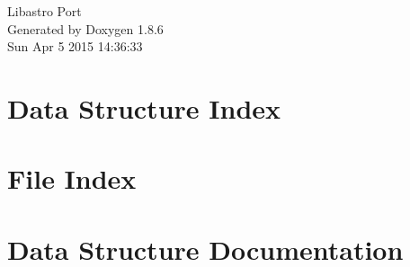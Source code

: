 \documentclass[twoside]{book}
\newcommand{\clearemptydoublepage}{%
  \newpage{\pagestyle{empty}\cleardoublepage}%
}
\begin{document}
\hypersetup{pageanchor=false}
\begin{titlepage}
\vspace*{7cm}
\begin{center}%
{\Large Libastro Port }\\
\vspace*{1cm}
{\large Generated by Doxygen 1.8.6}\\
\vspace*{0.5cm}
{\small Sun Apr 5 2015 14:36:33}\\
\end{center}
\end{titlepage}
\clearemptydoublepage
\tableofcontents
\clearemptydoublepage
{}
\hypersetup{pageanchor=true}

\chapter{Data Structure Index}

\chapter{File Index}

\chapter{Data Structure Documentation}



























\end{document}
